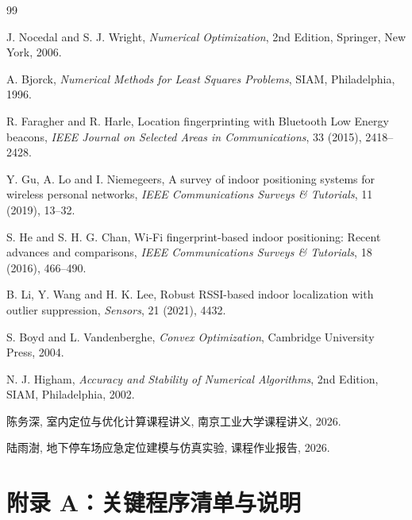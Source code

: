 \documentclass[openany]{./MathematicalModelCaseStudyReport}
\let\cleardoublepage\clearpage
\numberwithin{algorithm}{chapter}
\begin{document}
\backmatter
\linespread{1.1}\selectfont
\begin{thebibliography}{99}
\thispagestyle{plain}

\newblock J. Nocedal and S. J. Wright,
\newblock \emph{Numerical Optimization}, 2nd Edition,
\newblock Springer, New York, 2006.

\newblock A. Bjorck,
\newblock \emph{Numerical Methods for Least Squares Problems},
\newblock SIAM, Philadelphia, 1996.

\newblock R. Faragher and R. Harle,
\newblock Location fingerprinting with Bluetooth Low Energy beacons,
\newblock \emph{IEEE Journal on Selected Areas in Communications}, 33 (2015), 2418--2428.

\newblock Y. Gu, A. Lo and I. Niemegeers,
\newblock A survey of indoor positioning systems for wireless personal networks,
\newblock \emph{IEEE Communications Surveys \& Tutorials}, 11 (2019), 13--32.

\newblock S. He and S. H. G. Chan,
\newblock Wi-Fi fingerprint-based indoor positioning: Recent advances and comparisons,
\newblock \emph{IEEE Communications Surveys \& Tutorials}, 18 (2016), 466--490.

\newblock B. Li, Y. Wang and H. K. Lee,
\newblock Robust RSSI-based indoor localization with outlier suppression,
\newblock \emph{Sensors}, 21 (2021), 4432.

\newblock S. Boyd and L. Vandenberghe,
\newblock \emph{Convex Optimization},
\newblock Cambridge University Press, 2004.

\newblock N. J. Higham,
\newblock \emph{Accuracy and Stability of Numerical Algorithms}, 2nd Edition,
\newblock SIAM, Philadelphia, 2002.

\newblock 陈务深,
\newblock 室内定位与优化计算课程讲义,
\newblock 南京工业大学课程讲义, 2026.

\newblock 陆雨澍,
\newblock 地下停车场应急定位建模与仿真实验,
\newblock 课程作业报告, 2026.

\end{thebibliography}

\clearpage{\pagestyle{empty}\cleardoublepage}
\chapter*{附录 A：关键程序清单与说明}

\end{document}
